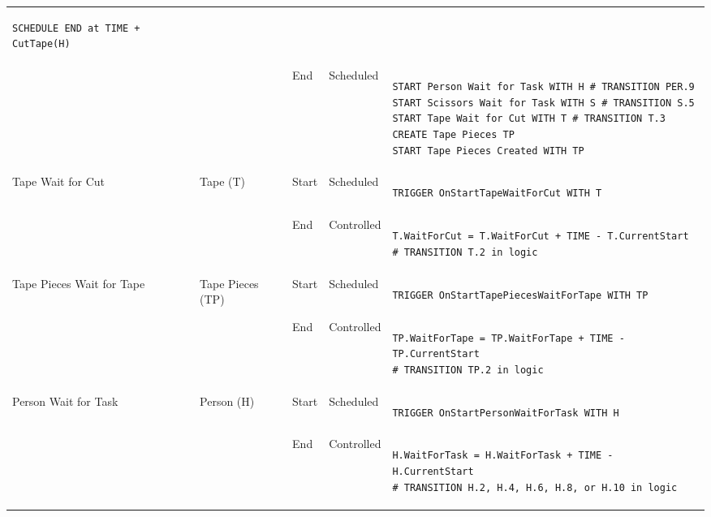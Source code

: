 \begin{longtable}{@{}>{\raggedright\arraybackslash}p{1.8cm}>{\raggedright\arraybackslash}p{2.1cm}>{\raggedright\arraybackslash}p{0.9cm}>{\raggedright\arraybackslash}p{2.2cm}>{\raggedright\arraybackslash}p{8.75cm}@{}}
\begin{lstlisting}[language=CMPseudo]
SCHEDULE END at TIME + CutTape(H)
\end{lstlisting}             \\
  &                                                          & End   & Scheduled & 
\begin{lstlisting}[language=CMPseudo]
START Person Wait for Task WITH H # TRANSITION PER.9
START Scissors Wait for Task WITH S # TRANSITION S.5
START Tape Wait for Cut WITH T # TRANSITION T.3
CREATE Tape Pieces TP
START Tape Pieces Created WITH TP
\end{lstlisting}             \\ \midrule
  Tape Wait for Cut         & Tape (T)                                & Start & Scheduled  & 
\begin{lstlisting}[language=CMPseudo]
TRIGGER OnStartTapeWaitForCut WITH T
\end{lstlisting}             \\
  &                                                          & End   & Controlled & 
\begin{lstlisting}[language=CMPseudo]
T.WaitForCut = T.WaitForCut + TIME - T.CurrentStart
# TRANSITION T.2 in logic
\end{lstlisting}             \\ \midrule
  Tape Pieces Wait for Tape & Tape Pieces (TP)                       & Start & Scheduled  & 
\begin{lstlisting}[language=CMPseudo]
TRIGGER OnStartTapePiecesWaitForTape WITH TP
\end{lstlisting}             \\
  &                                                          & End   & Controlled & 
\begin{lstlisting}[language=CMPseudo]
TP.WaitForTape = TP.WaitForTape + TIME - TP.CurrentStart
# TRANSITION TP.2 in logic
\end{lstlisting}             \\ \midrule
  Person Wait for Task      & Person (H)                              & Start & Scheduled  & 
\begin{lstlisting}[language=CMPseudo]
TRIGGER OnStartPersonWaitForTask WITH H
\end{lstlisting}             \\
  &                                                          & End   & Controlled & 
\begin{lstlisting}[language=CMPseudo]
H.WaitForTask = H.WaitForTask + TIME - H.CurrentStart
# TRANSITION H.2, H.4, H.6, H.8, or H.10 in logic
\end{lstlisting}             \\ \bottomrule
  \end{longtable}